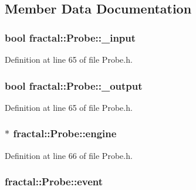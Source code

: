 \subsection{Member Data Documentation}
\hypertarget{classfractal_1_1Probe_ae30770576d97d498d261568425194dc7}{
\subsubsection[{\+\_\+input}]{\setlength{\rightskip}{0pt plus 5cm}bool fractal\+::\+Probe\+::\+\_\+input\hspace{0.3cm}{\ttfamily [protected]}}}\label{classfractal_1_1Probe_ae30770576d97d498d261568425194dc7}


Definition at line 65 of file Probe.\+h.

\hypertarget{classfractal_1_1Probe_acbc689a83084b63d5d774a139e7f99b3}{
\subsubsection[{\+\_\+output}]{\setlength{\rightskip}{0pt plus 5cm}bool fractal\+::\+Probe\+::\+\_\+output\hspace{0.3cm}{\ttfamily [protected]}}}\label{classfractal_1_1Probe_acbc689a83084b63d5d774a139e7f99b3}


Definition at line 65 of file Probe.\+h.

\hypertarget{classfractal_1_1Probe_a20487048a2d0f3e33eb4a53dac23dd22}{
\subsubsection[{engine}]{$\ast$ fractal\+::\+Probe\+::engine\hspace{0.3cm}{\ttfamily [protected]}}}\label{classfractal_1_1Probe_a20487048a2d0f3e33eb4a53dac23dd22}


Definition at line 66 of file Probe.\+h.

\hypertarget{classfractal_1_1Probe_a09b0d12f41483fd93c6449040ba1f540}{
\subsubsection[{event}]{ fractal\+::\+Probe\+::event\hspace{0.3cm}{\ttfamily [protected]}}}\label{classfractal_1_1Probe_a09b0d12f41483fd93c6449040ba1f540}


